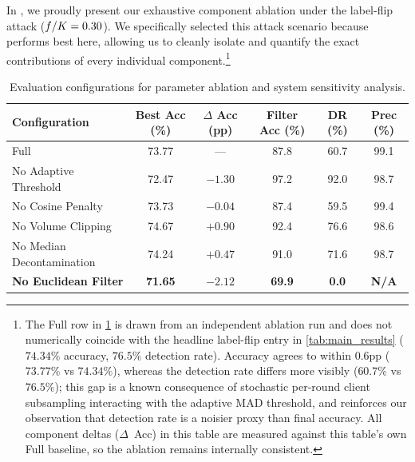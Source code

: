 \documentclass[../main.tex]{subfiles}
\begin{document}
In , we proudly present our exhaustive component ablation under the label-flip attack ($f/K=0.30$). We specifically selected this attack scenario because \aegis{} performs best here, allowing us to cleanly isolate and quantify the exact contributions of every individual component.\footnote{The Full \aegis{} row in \cref{tab:ablation_label_flip} is drawn from an independent ablation run and does not numerically coincide with the headline label-flip entry in \cref{tab:main_results} ($74.34\%$ accuracy, $76.5\%$ detection rate). Accuracy agrees to within $0.6$pp ($73.77\%$ vs $74.34\%$), whereas the detection rate differs more visibly ($60.7\%$ vs $76.5\%$); this gap is a known consequence of stochastic per-round client subsampling interacting with the adaptive MAD threshold, and reinforces our observation that detection rate is a noisier proxy than final accuracy. All component deltas ($\Delta$~Acc) in this table are measured against this table's own Full \aegis{} baseline, so the ablation remains internally consistent.}

\begin{table}[htbp]
\centering
\caption[Evaluation configurations for parameter ablation and system sensitivity]{Evaluation configurations for parameter ablation and system sensitivity analysis.}
\label{tab:ablation_label_flip}
\small
\setlength{\tabcolsep}{5pt}
\begin{tabularx}{\linewidth}{>{\raggedright\arraybackslash}Xccccc}
\toprule
\textbf{Configuration} & \textbf{Best Acc (\%)} & \textbf{$\Delta$ Acc (pp)} & \textbf{Filter Acc (\%)} & \textbf{DR (\%)} & \textbf{Prec (\%)} \\
\midrule
Full \aegis{}          & 73.77 & ---    & 87.8 & 60.7 & 99.1 \\
No Adaptive Threshold  & 72.47 & $-1.30$ & 97.2 & 92.0 & 98.7 \\
No Cosine Penalty      & 73.73 & $-0.04$ & 87.4 & 59.5 & 99.4 \\
No Volume Clipping     & 74.67 & $+0.90$ & 92.4 & 76.6 & 98.6 \\
No Median Decontamination & 74.24 & $+0.47$ & 91.0 & 71.6 & 98.7 \\
\textbf{No Euclidean Filter} & \textbf{71.65} & $\mathbf{-2.12}$ & \textbf{69.9} & \textbf{0.0} & \textbf{N/A} \\
\bottomrule
\end{tabularx}
\end{table}
\end{document}
